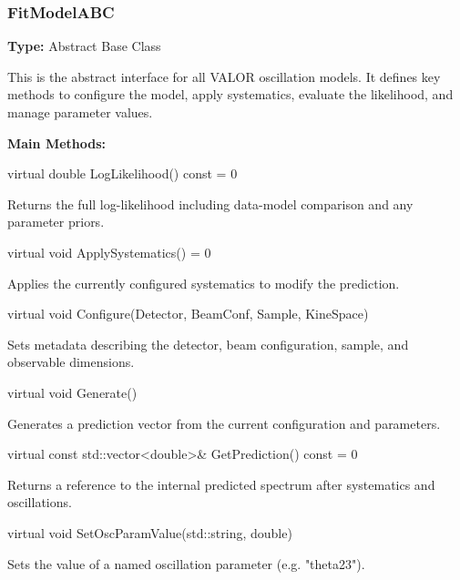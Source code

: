 \vspace{1em}
\subsubsection*{\color{cadmiumgreen}\bf FitModelABC}

\textbf{Type:} Abstract Base Class

\vspace{0.5em}
This is the abstract interface for all VALOR oscillation models.  
It defines key methods to configure the model, apply systematics, evaluate the likelihood, and manage parameter values.

\vspace{0.5em}
\noindent\textbf{Main Methods:}

\begin{description}[align=left, labelsep=0.6em]

  \item[] {\color{cadmiumred} virtual double LogLikelihood() const = 0}

  Returns the full log-likelihood including data-model comparison and any parameter priors.

  \item[] {\color{cadmiumred} virtual void ApplySystematics() = 0}

  Applies the currently configured systematics to modify the prediction.

  \item[] {\color{cadmiumred} virtual void Configure(Detector, BeamConf, Sample, KineSpace)}

  Sets metadata describing the detector, beam configuration, sample, and observable dimensions.

  \item[] {\color{cadmiumred} virtual void Generate()}

  Generates a prediction vector from the current configuration and parameters.

  \item[] {\color{cadmiumred} virtual const std::vector<double>\& GetPrediction() const = 0}

  Returns a reference to the internal predicted spectrum after systematics and oscillations.

  \item[] {\color{cadmiumred} virtual void SetOscParamValue(std::string, double)}

  Sets the value of a named oscillation parameter (e.g. {\color{amber}"theta23"}).


\end{description}
